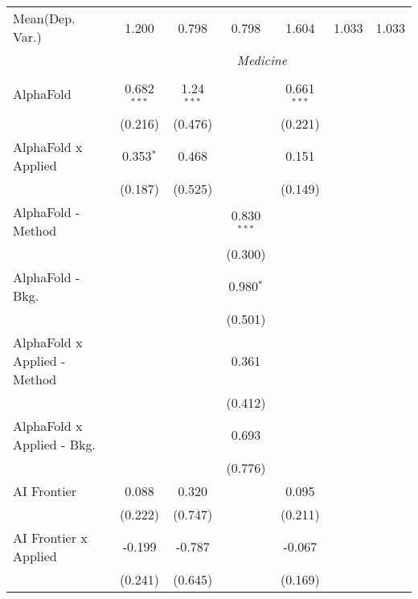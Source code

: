 \begin{tabular}{lcccccc}
Mean(Dep. Var.) & 1.200 & 0.798 & 0.798 & 1.604 & 1.033 & 1.033 \\
 & \multicolumn{6}{c}{\textit{Medicine}} \\ \\
   AlphaFold                      & 0.682$^{***}$ & 1.24$^{***}$ &               & 0.661$^{***}$ &        &   \\   
                                  & (0.216)       & (0.476)      &               & (0.221)       &        &   \\   
   AlphaFold x Applied            & 0.353$^{*}$   & 0.468        &               & 0.151         &        &   \\   
                                  & (0.187)       & (0.525)      &               & (0.149)       &        &   \\   
   AlphaFold - Method             &               &              & 0.830$^{***}$ &               &        &   \\   
                                  &               &              & (0.300)       &               &        &   \\   
   AlphaFold - Bkg.               &               &              & 0.980$^{*}$   &               &        &   \\   
                                  &               &              & (0.501)       &               &        &   \\   
   AlphaFold x Applied - Method   &               &              & 0.361         &               &        &   \\   
                                  &               &              & (0.412)       &               &        &   \\   
   AlphaFold x Applied - Bkg.     &               &              & 0.693         &               &        &   \\   
                                  &               &              & (0.776)       &               &        &   \\   
   AI Frontier                    & 0.088         & 0.320        &               & 0.095         &        &   \\   
                                  & (0.222)       & (0.747)      &               & (0.211)       &        &   \\   
   AI Frontier x Applied          & -0.199        & -0.787       &               & -0.067        &        &   \\   
                                  & (0.241)       & (0.645)      &               & (0.169)       &        &   \\   

\end{tabular}
